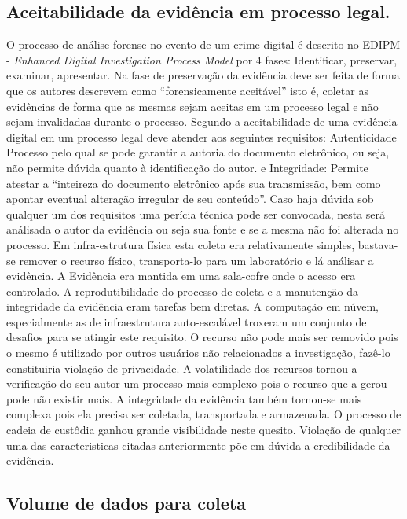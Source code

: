 \subsection{Aceitabilidade da evidência em processo legal.}
\label{sec:credibilidadeaceitabilidadeevidencia}

O processo de análise forense no evento de um crime digital é descrito no EDIPM - \textit{Enhanced Digital Investigation Process Model} por 4 fases: Identificar, preservar, examinar, apresentar. \cite{GrisposChallengesCloudComputing:2012}
%
Na fase de preservação da evidência deve ser feita de forma que os autores descrevem como ``forensicamente aceitável'' isto é, coletar as evidências de forma que as mesmas sejam aceitas em um processo legal e não sejam invalidadas durante o processo.
%
Segundo \cite{Ramos:2011} a aceitabilidade de uma evidência digital em um processo legal deve atender aos seguintes requisitos: Autenticidade Processo pelo qual se pode garantir a autoria do documento eletrônico, ou seja, não permite dúvida quanto à identificação do autor.
%
e Integridade: Permite atestar a “inteireza do documento eletrônico após sua transmissão, bem como apontar eventual alteração irregular de seu conteúdo”.
%
Caso haja dúvida sob qualquer um dos requisitos uma perícia técnica pode ser convocada, nesta será análisada o autor da evidência ou seja sua fonte e se a mesma não foi alterada no processo.
%
Em infra-estrutura física esta coleta era relativamente simples, bastava-se remover o recurso físico, transporta-lo para um laboratório e lá análisar a evidência. A Evidência era mantida em uma sala-cofre onde o acesso era controlado.
%
A reprodutibilidade do processo de coleta e a manutenção da integridade da evidência eram tarefas bem diretas.
%
A computação em núvem, especialmente as de infraestrutura auto-escalável troxeram um conjunto de desafios para se atingir este requisito. O recurso não pode mais ser removido pois o mesmo é utilizado por outros usuários não relacionados a investigação, fazê-lo constituiria violação de privacidade.
%
A volatilidade dos recursos tornou a verificação do seu autor um processo mais complexo pois o recurso que a gerou pode não existir mais.
%
A integridade da evidência também tornou-se mais complexa pois ela precisa ser coletada, transportada e armazenada. O processo de cadeia de custôdia ganhou grande visibilidade neste quesito.
%
Violação de qualquer uma das caracteristicas citadas anteriormente põe em dúvida a credibilidade da evidência.

\subsection{Volume de dados para coleta}
\label{sec:volumedados}

